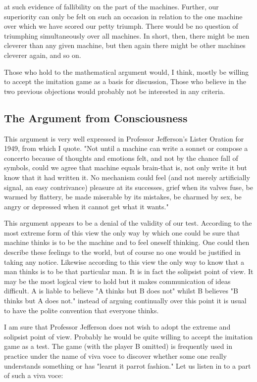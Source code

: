 \documentclass{article}
\begin{document}
at such evidence of fallibility on the part of the machines. Further, our superiority can only be felt on such an occasion in relation to the one machine over which we have scored our petty triumph. There would be no question of triumphing simultaneously over all machines. In short, then, there might be men cleverer than any given machine, but then again there might be other machines cleverer again, and so on.

Those who hold to the mathematical argument would, I think, mostly be willing to accept the imitation game as a basis for discussion, Those who believe in the two previous objections would probably not be interested in any criteria.


\subsection{The Argument from Consciousness}

This argument is very well expressed in Professor Jefferson's Lister Oration for 1949, from which I quote. "Not until a machine can write a sonnet or compose a concerto because of thoughts and emotions felt, and not by the chance fall of symbols, could we agree that machine equals brain-that is, not only write it but know that it had written it. No mechanism could feel (and not merely artificially signal, an easy contrivance) pleasure at its successes, grief when its valves fuse, be warmed by flattery, be made miserable by its mistakes, be charmed by sex, be angry or depressed when it cannot get what it wants."

This argument appears to be a denial of the validity of our test. According to the most extreme form of this view the only way by which one could be sure that machine thinks is to be the machine and to feel oneself thinking. One could then describe these feelings to the world, but of course no one would be justified in taking any notice. Likewise according to this view the only way to know that a man thinks is to be that particular man. It is in fact the solipsist point of view. It may be the most logical view to hold but it makes communication of ideas difficult. A is liable to believe "A thinks but B does not" whilst B believes "B thinks but A does not." instead of arguing continually over this point it is usual to have the polite convention that everyone thinks.

I am sure that Professor Jefferson does not wish to adopt the extreme and solipsist point of view. Probably he would be quite willing to accept the imitation game as a test. The game (with the player B omitted) is frequently used in practice under the name of viva voce to discover whether some one really understands something or has "learnt it parrot fashion." Let us listen in to a part of such a viva voce:
\end{document}
